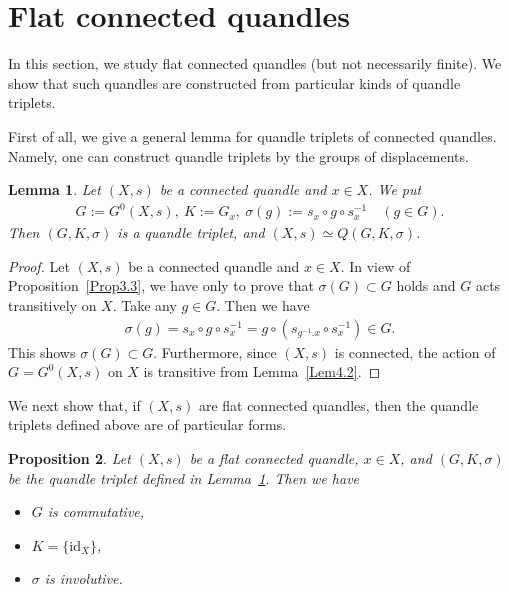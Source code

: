 \documentclass[12pt]{amsart}
\newtheorem{Prop}{Proposition}[section]
\newtheorem{Lem}[Prop]{Lemma}
\theoremstyle{definition}
\begin{document}
\section{Flat connected quandles}\label{sec5}

In this section, we study flat connected quandles (but not necessarily finite). We show that such quandles are constructed from particular kinds of quandle triplets.

First of all, we give a general lemma for quandle triplets of connected quandles. Namely, one can construct quandle triplets by the groups of displacements.

\begin{Lem}\label{Lem5.1}
Let $ (X,s) $ be a connected quandle and $ x \in X $. We put
\begin{align*}
G := G^{0}(X,s),\ K := G_{x},\ \sigma(g) := s_{x} \circ g \circ s^{-1}_{x} \quad (g \in G).
\end{align*}
Then $ (G,K,\sigma) $ is a quandle triplet, and $ (X,s) \simeq Q(G,K,\sigma) $.
\end{Lem}

\begin{proof}
Let $ (X,s) $ be a connected quandle and $ x \in X $. In view of Proposition~\ref{Prop3.3}, we have only to prove that $ \sigma(G) \subset G $ holds and $ G $ acts transitively on $ X $. Take any $ g \in G $. Then we have
\begin{align*}
\sigma(g) =  s_{x} \circ g \circ s^{-1}_{x} = g \circ (s_{g^{-1}.x} \circ s^{-1}_{x}) \in G.
\end{align*}
This shows $ \sigma(G) \subset G $. Furthermore, since $ (X,s) $ is connected, the action of $ G=G^{0}(X,s) $ on $ X $ is transitive from Lemma~\ref{Lem4.2}.
\end{proof}

We next show that, if $ (X,s) $ are flat connected quandles, then the quandle triplets defined above are of particular forms.

\begin{Prop}\label{Prop5.2}
Let $ (X,s) $ be a flat connected quandle, $ x \in X $, and $ (G,K,\sigma) $ be the quandle triplet defined in Lemma~\ref{Lem5.1}. Then we have
\begin{itemize}
\item[(1)]
$ G $ is commutative,
\item[(2)]
$ K = \{ {\mathrm{id}}_{X} \} $,
\item[(3)]
$ \sigma $ is involutive.
\end{itemize}
\end{Prop}
\end{document}
